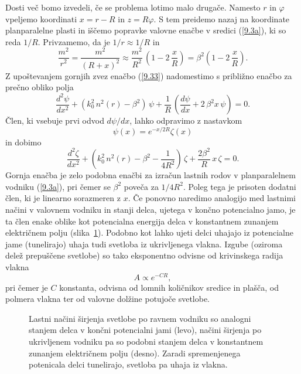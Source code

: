 Dosti več bomo izvedeli, če se problema lotimo malo drugače. Namesto $r$
in $\varphi$ vpeljemo koordinati $x=r-R$ in $z=R\varphi$.
S tem preidemo nazaj na koordinate planparalelne plasti in iščemo popravke valovne
enačbe v sredici (\ref{9.3a}), ki so reda $1/R.$ Privzamemo, da je $1/r\approx1/R$ in 
\begin{equation}
\frac{m^{2}}{r^{2}}=\frac{m^{2}}{\left(R+x\right)^{2}}\approx\frac{m^{2}}
{R^{2}}\,\left(1-2\,\frac{x}{R}\right)=\beta^{2}\left(1-2\,\frac{x}{R}\right).
\label{9.34}
\end{equation}
Z upoštevanjem gornjih zvez enačbo (\ref{9.33}) nadomestimo s približno enačbo za prečno obliko
polja 
\begin{equation}
\frac{d^{2}\psi}{dx^{2}}+\left(k_{0}^{2}\, n^{2}\left(r\right)-\beta^{2}\right)\,\psi+\frac{1}{R}\,
\left(\frac{d\psi}{dx}+2\,\beta^{2}x\,\psi\right)=0.
\label{9.35}
\end{equation}
Člen, ki vsebuje prvi odvod $d \psi/d x$, lahko odpravimo z nastavkom 
\begin{equation}
\psi(x) = e^{-x/2R} \zeta(x)
\end{equation}
in dobimo 
\begin{equation}
\frac{d^{2}\zeta}{dx^{2}}+\left(k_{0}^{2}\, n^{2}\left(r\right)-\beta^{2}-\frac{1}{4R^2}\right)\,\zeta
+ \frac{2\beta^{2}}{R}\,x\,\zeta=0.
\label{9.35}
\end{equation}
Gornja enačba je zelo podobna enačbi za izračun lastnih rodov v planparalelnem
vodniku (\ref{9.3a}), pri čemer se $\beta^2$ poveča za $1/4R^2$. Poleg tega je prisoten
dodatni člen, ki je linearno sorazmeren z $x$. Če ponovno naredimo analogijo
med lastnimi načini v valovnem vodniku in stanji delca, ujetega v končno potencialno jamo, 
je ta člen enake oblike kot potencialna energija delca v konstantnem zunanjem električnem 
polju (slika~\ref{fig:tunel}). Podobno kot lahko ujeti delci uhajajo iz potencialne jame
(tunelirajo) uhaja tudi svetloba iz ukrivljenega vlakna. Izgube (oziroma delež prepuščene 
svetlobe) so tako eksponentno odvisne od krivinskega radija vlakna 
\begin{equation}
A \propto e^{-CR},
\end{equation}
pri čemer je $C$ konstanta, odvisna od lomnih količnikov sredice in plašča, od polmera vlakna 
ter od valovne dolžine potujoče svetlobe.
\begin{figure}[h]
\centering
\def\svgwidth{120truemm} 
 
\caption{Lastni načini širjenja svetlobe po ravnem vodniku so analogni stanjem 
delca v končni potencialni jami (levo), načini širjenja po ukrivljenem vodniku pa 
so podobni stanjem delca v konstantnem zunanjem električnem polju (desno). Zaradi
spremenjenega potenicala delci tunelirajo, svetloba pa uhaja iz vlakna.}
\label{fig:tunel}
\end{figure}

